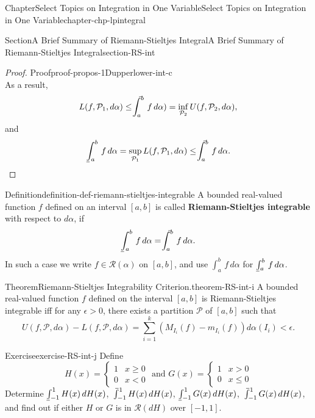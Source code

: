\documentclass[oneside,10pt,]{book}
\makeatletter
\newcommand{\terminology}[1]{\textbf{#1}}
\numberwithin{equation}{section}
\newcommand{\qedhere}{\relax}
\newcommand{\cP}{\mathcal{P}}
\newcommand{\cR}{\mathcal{R}}
\def\upint{\mathchoice
    {\mkern10mu\overline{\vphantom{\intop}\mkern7mu}\mkern-24mu}
    {\mkern7mu\overline{\vphantom{\intop}\mkern7mu}\mkern-14mu}
    {\mkern7mu\overline{\vphantom{\intop}\mkern7mu}\mkern-14mu}
    {\mkern7mu\overline{\vphantom{\intop}\mkern7mu}\mkern-14mu}
  \int}
\def\lowint{\relax\if@display
 \mkern3mu\underline{\vphantom{\intop}\mkern7mu}\mkern-10mu\int
\else 
\underline{\vphantom{\int}\mkern7mu}\mkern-10mu\int
\fi}
\newcommand{\amp}{&}
\makeatother
\begin{document}
\begin{chapterptx}{Chapter}{Select Topics on Integration in One Variable}{}{Select Topics on Integration in One Variable}{}{}{chapter-chp-lpintegral}
\begin{sectionptx}{Section}{A Brief Summary of Riemann-Stieltjes Integral}{}{A Brief Summary of Riemann-Stieltjes Integral}{}{}{section-RS-int}
\begin{proof}{Proof}{}{proof-propos-1Dupperlower-int-c}
\begin{equation*}
\end{equation*}
As a result,%
\begin{equation*}
L(f, \cP_{1}, d \alpha)\le  \upint_a^b \,f\, d \alpha) =\inf_{\cP_{2}} U(f, \cP_{2}, d \alpha),
\end{equation*}
and%
\begin{equation*}
\lowint_a^b \,f\, d \alpha =\sup_{\cP_{1}} L(f, \cP_{1}, d \alpha)\le \upint_a^b \,f\, d \alpha.\qedhere
\end{equation*}
%
\end{proof}
\begin{definition}{Definition}{}{definition-def-riemann-stieltjes-integrable}%
%
\label{notation-def-riemann-stieltjes-integrable-b}%
A bounded real-valued function \(f\) defined on an interval \([a, b]\) is called \terminology{Riemann-Stieltjes integrable} with respect to \(d\alpha\), if%
\begin{equation*}
\lowint_a^b\,f\, d\alpha =  \upint_a^b\,f\, d\alpha.
\end{equation*}
In such a case we write \(f\in \cR(\alpha)\) on \([a, b]\), and use \(\int_{a}^{b} \,f\, d\alpha\) for \(\lowint_a^b\,f\, d\alpha \).%
\end{definition}
\begin{theorem}{Theorem}{Riemann-Stieltjes Integrability Criterion.}{}{theorem-RS-int-i}%
A bounded real-valued function \(f\) defined on the interval \([a, b]\) is Riemann-Stieltjes integrable iff for any \(\epsilon > 0\), there exists a partition \(\cP\) of \([a, b]\) such that%
\begin{equation}
U(f, \cP, d\alpha) - L(f, \cP, d\alpha) =
\sum_{i=1}^{k}\left( M_{I_{i}} (f) -m_{I_{i}} (f)\right) d\alpha (I_{i})< \epsilon.\label{men-RS-IntC}
\end{equation}
\end{theorem}
\begin{inlineexercise}{Exercise}{}{exercise-RS-int-j}%
Define%
\begin{equation*}
H(x)=\begin{cases} 1 \amp x \ge 0 \\ 0 \amp x < 0 
\end{cases}
\text{ and }
G(x) =\begin{cases} 1 \amp x > 0 \\ 0 \amp x \le 0 
\end{cases} 
\end{equation*}
Determine \(\lowint_{-1}^{1} H(x)\, dH(x)\), \(\upint_{-1}^{1} H(x)\, dH(x)\), \(\lowint_{-1}^{1} G(x)\, dH(x)\), \(\upint_{-1}^{1} G(x)\, dH(x)\), and find out if either \(H\) or \(G\) is in \(\cR(dH)\) over \([-1, 1]\).%

\end{inlineexercise}
\end{sectionptx}
\end{chapterptx}
\end{document}
